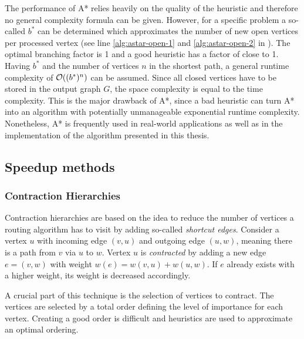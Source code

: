 			The performance of A* relies heavily on the quality of the heuristic and therefore no general complexity formula can be given\cite{russell-norvig-ai-modern-approach}.
			However, for a specific problem a so-called  $b^*$ can be determined which approximates the number of new open vertices per processed vertex (see line \ref{alg:astar-open-1} and \ref{alg:astar-open-2} in ).
			The optimal branching factor is 1 and a good heuristic has a factor of close to 1.
			Having $b^*$ and the number of vertices $n$ in the shortest path, a general runtime complexity of $\mathcal{O}((b^*)^n)$ can be assumed.
			Since all closed vertices have to be stored in the output graph $G$, the space complexity is equal to the time complexity.
			This is the major drawback of A*, since a bad heuristic can turn A* into an algorithm with potentially unmanageable exponential runtime complexity.
			Nonetheless, A* is frequently used in real-world applications as well as in the implementation of the algorithm presented in this thesis.
		
	\subsection{Speedup methods}
	\label{subsec:speedup-methods}
		
		\subsubsection{Contraction Hierarchies}
		\label{subsubsec:ch}
		
			Contraction hierarchies are based on the idea to reduce the number of vertices a routing algorithm has to visit by adding so-called \emph{shortcut edges}\cite{geisberger-contraction-hierarchies}.
			Consider a vertex $u$ with incoming edge $(v, u)$ and outgoing edge $(u, w)$, meaning there is a path from $v$ via $u$ to $w$.
			Vertex $u$ is \emph{contracted} by adding a new edge $e = (v, w)$ with weight $w(e) = w(v, u) + w(u, w)$.
			If $e$ already exists with a higher weight, its weight is decreased accordingly.
			
			A crucial part of this technique is the selection of vertices to contract\cite[14]{geisberger-contraction-hierarchies}.
			The vertices are selected by a total order defining the level of importance for each vertex.
			Creating a good order is difficult and heuristics are used to approximate an optimal ordering.
			
